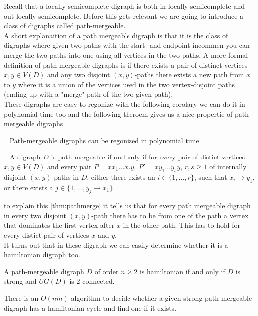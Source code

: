 Recall that a locally semicomplete digraph is both in-locally semicomplete and out-locally semicomplete. 
Before this gets relevant we are going to introduce a class of digraphs called path-mergeable.\\
A short explanaition of a path mergeable digraph is that it is the class of digraphs where given two paths with the start- and endpoint incommen you can merge the two paths into one using all vertices in the two paths. 
A more formal definition of path mergeable digraphs is if there exists a pair of distinct vertices $x,y\in V(D)$ and any two disjoint $(x,y)$-paths there exists a new path from $x$ to $y$ where it is a union of the vertices used in the two vertex-disjoint paths (ending up with a "merge" path of the two given path).\\
These digraphs are easy to regonize with the following corolary we can do it in polynomial time too and the following theroem gives us a nice propertie of path-mergeable digraphs.
\begin{cor}~\cite{banggutin}
    Path-mergeable digraphs can be regonized in polynomial time
\end{cor}
\begin{thm}~\cite{banggutin}
    A digraph $D$ is path mergeable if and only if for every pair of distict vertices $x,y\in V(D)$ and every pair $P=xx_1\dots x_ry,\ P'=xy_1\dots y_sy$, $r,s\geq 1$ of internally disjoint $(x,y)$-paths in $D$, either there exists an $i\in \lbrace 1,\dots ,r\rbrace$, such that $x_i\rightarrow y_1$, or there exists a $j\in \lbrace 1,\dots, y_j\rightarrow x_1\rbrace$.
    \label{thm:pathmerge}
\end{thm}
to explain this \autoref{thm:pathmerge} it tells us that for every path mergeable digraph in every two disjoint $(x,y)$-path there has to be from one of the path a vertex that dominates the first vertex after $x$ in the other path. 
This has to hold for every distict pair of vertices $x$ and $y$. \\
It turns out that in these digraph we can easily determine whether it is a hamiltonian digraph too.
\begin{thm}
    A path-mergeable digraph $D$ of order $n\geq 2$ is hamiltonian if and only if $D$ is strong and $UG(D)$ is $2$-connected.
    \label{thm:pathham}
\end{thm}
\begin{cor}
    There is an $O(nm)$-algorithm to decide whether a given strong path-mergeable digraph has a hamiltonian cycle and find one if it exists.
    \label{cor:polypath}
\end{cor}
